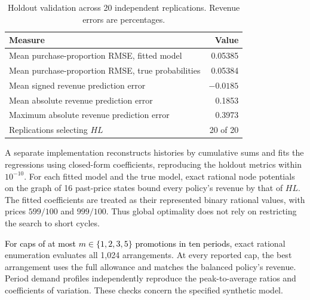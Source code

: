 \begin{table}[ht]
\centering\small\color{black}
\caption{Holdout validation across 20 independent replications. Revenue errors are percentages.}
\label{tab:subscription-holdout}
\begin{tabular}{lr}
\toprule
Measure&Value\\
\midrule
Mean purchase-proportion RMSE, fitted model&0.05385\\
Mean purchase-proportion RMSE, true probabilities&0.05384\\
Mean signed revenue prediction error&\(-0.0185\)\\
Mean absolute revenue prediction error&0.1853\\
Maximum absolute revenue prediction error&0.3973\\
Replications selecting \(HL\)&20 of 20\\
\bottomrule
\end{tabular}
\end{table}

A separate implementation reconstructs histories by cumulative sums and fits the regressions using closed-form coefficients, reproducing the holdout metrics within \(10^{-10}\). For each fitted model and the true model, exact rational node potentials on the graph of 16 past-price states bound every policy's revenue by that of \(HL\). The fitted coefficients are treated as their represented binary rational values, with prices \(599/100\) and \(999/100\). Thus global optimality does not rely on restricting the search to short cycles.

\textcolor{black}{For caps of at most \(m\in\{1,2,3,5\}\) promotions in ten periods,} exact rational enumeration evaluates all 1,024 arrangements. At every reported cap, the best arrangement uses the full allowance and matches the balanced policy's revenue. Period demand profiles independently reproduce the peak-to-average ratios and coefficients of variation. These checks concern the specified synthetic model.
\begin{table}[ht]
\centering\small\color{black}
\setlength{\tabcolsep}{3pt}
\caption{Promotion budgets in the access-service example, with \(\mathcal T=10\). Revenue is average monthly revenue; Gain is relative to constant regular pricing. Peak/avg and CV describe monthly demand, with CV using the population standard deviation. Premium is the revenue gain of balanced over single block at the same count.}
\label{tab:promotion-budget-performance}

\end{table}
\par\endgroup

